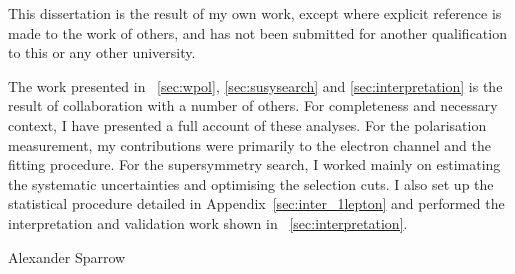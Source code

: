 \begin{declaration}
  This dissertation is the result of my own work, except where explicit
  reference is made to the work of others, and has not been submitted
  for another qualification to this or any other university.

  The work presented in \chaps~\ref{sec:wpol}, \ref{sec:susysearch} and
  \ref{sec:interpretation} is the result of collaboration with a number of
  others. For completeness and necessary context, I have presented a full
  account of these analyses. For the \PW polarisation measurement, my
  contributions were primarily to the electron channel and the fitting
  procedure. For the supersymmetry search, I worked mainly on estimating the
  systematic uncertainties and optimising the selection cuts. I also set
  up the statistical procedure detailed in Appendix~\ref{sec:inter_1lepton} and
  performed the interpretation and validation work shown in
  \chap~\ref{sec:interpretation}.

  \vspace*{1cm}
  \begin{flushright}
    Alexander Sparrow
  \end{flushright}
\end{declaration}


